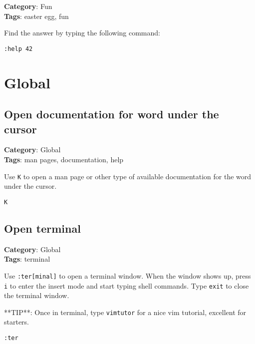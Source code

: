 {{{{{{\textbf{Category}: Fun\\ \textbf{Tags}: easter egg, fun
\vspace{0.5cm}

Find the answer by typing the following command:

\begin{Exa*}{}
\begin{Verbatim}[fontsize=\footnotesize, breaklines, breakanywhere]
:help 42
\end{Verbatim}
\end{Exa*}

\chapter{Global}
\section{Open documentation for word under the cursor}

\textbf{Category}: Global\\ \textbf{Tags}: man pages, documentation, help
\vspace{0.5cm}

Use {\footnotesize \Verb§K§} to open a man page or other type of available documentation for the word under the cursor. 

\begin{Exa*}{}
\begin{Verbatim}[fontsize=\footnotesize, breaklines, breakanywhere]
K
\end{Verbatim}
\end{Exa*}

\section{Open terminal}

\textbf{Category}: Global\\ \textbf{Tags}: terminal
\vspace{0.5cm}

Use {\footnotesize \Verb§:ter[minal]§} to open a terminal window. When the window shows up, press {\footnotesize \Verb§i§} to enter the insert mode and start typing shell commands. Type {\footnotesize \Verb§exit§} to close the terminal window. 

**TIP**: Once in terminal, type {\footnotesize \Verb§vimtutor§} for a nice vim tutorial, excellent for starters.

\begin{Exa*}{}
\begin{Verbatim}[fontsize=\footnotesize, breaklines, breakanywhere]
:ter
\end{Verbatim}
\end{Exa*}

}}}}}}

